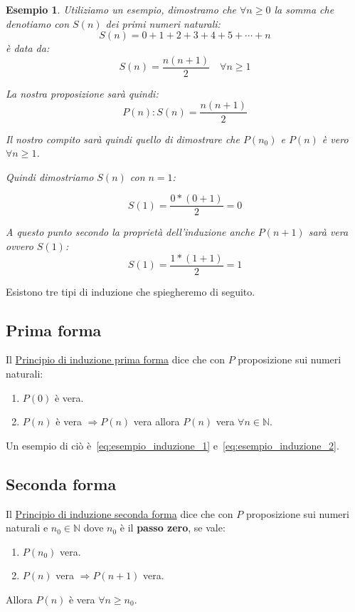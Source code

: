 \documentclass{article}
\newtheorem{exmp}{Esempio}[section]
\theoremstyle{definition}
\begin{document}
\begin{exmp}\label{es:esempio_induzione}
Utiliziamo un esempio, dimostramo che $\forall n \ge 0$ la somma che denotiamo con $S(n)$ dei primi numeri naturali:
\begin{equation*}
        S(n) = 0 + 1 + 2 + 3 + 4 + 5 + \cdots + n
\end{equation*}
è data da:
\begin{equation*}
        S(n) = \frac{n(n+1)}{2} \quad \forall n \ge 1
\end{equation*}

La nostra proposizione sarà quindi:
\begin{equation*}
        P(n) : S(n) = \frac{n(n+1)}{2}
\end{equation*}

Il nostro compito sarà quindi quello di dimostrare che $P(n_0)$ e $P(n)$ è vero $\forall n \ge 1$. \par
Quindi dimostriamo $S(n)$ con $n = 1$:
        
\begin{equation}\label{eq:esempio_induzione_1}
        S(1) = \frac{0*(0+1)}{2} = 0
\end{equation}

A questo punto secondo la proprietà dell'induzione anche $P(n+1)$ sarà vera ovvero $S(1)$:
\begin{equation}\label{eq:esempio_induzione_2}
        S(1) = \frac{1*(1+1)}{2} = 1
\end{equation}
\end{exmp}
Esistono tre tipi di induzione che spiegheremo di seguito.



\subsection{Prima forma}\label{sec:induzione_prima_forma}
Il \underline{Principio di induzione prima forma} dice che con $P$ proposizione sui numeri naturali:
\begin{enumerate}
        \item $P(0)$ è vera. 
        \item $P(n)$ è vera $\Rightarrow P(n)$ vera allora $P(n)$ vera $\forall n \in \mathbb{N}$. 
\end{enumerate}
Un esempio di ciò è~\ref{eq:esempio_induzione_1} e~\ref{eq:esempio_induzione_2}.



\subsection{Seconda forma}\label{sec:induzione_seconda_forma}
Il \underline{Principio di induzione seconda forma} dice che con $P$ proposizione sui numeri naturali e $n_0 \in \mathbb{N}$ dove $n_0$ è il \textbf{passo zero}, se vale:
\begin{enumerate}
        \item $P(n_0)$ vera.
        \item $P(n)$ vera $\Rightarrow P(n+1)$ vera.
\end{enumerate}
Allora $P(n)$ è vera $\forall n \ge n_0$.
\end{document}
